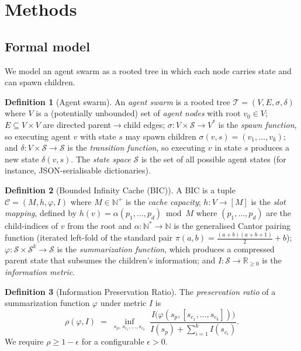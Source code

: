 \documentclass[fleqn,10pt]{article}
\theoremstyle{definition}
\newtheorem{definition}{Definition}
\newcommand{\BIC}{\mathcal{C}}
\newcommand{\States}{\mathcal{S}}
\newcommand{\Tree}{\mathcal{T}}
\newcommand{\info}{I}
\newcommand{\summarize}{\varphi}
\newcommand{\cantor}{\alpha}
\newcommand{\preserv}{\rho}
\newcommand{\Nat}{\mathbb{N}}
\newcommand{\Real}{\mathbb{R}}
\newcommand{\slots}{M}
\begin{document}
\section*{Methods}

\subsection*{Formal model}

We model an agent swarm as a rooted tree in which each node carries
state and can spawn children.

\begin{definition}[Agent swarm]
\label{def:swarm}
An \emph{agent swarm} is a rooted tree $\Tree = (V, E, \sigma, \delta)$
where $V$ is a (potentially unbounded) set of \emph{agent nodes} with
root $v_0 \in V$; $E \subseteq V \times V$ are directed parent$\to$child
edges; $\sigma: V \times \States \to V^*$ is the \emph{spawn function},
so executing agent $v$ with state $s$ may spawn children
$\sigma(v,s) = (v_1, \dots, v_k)$; and
$\delta: V \times \States \to \States$ is the \emph{transition
function}, so executing $v$ in state $s$ produces a new state
$\delta(v,s)$. The \emph{state space} $\States$ is the set of all
possible agent states (for instance, JSON-serialisable dictionaries).
\end{definition}

\begin{definition}[Bounded Infinity Cache (BIC)]
\label{def:bic}
A BIC is a tuple $\BIC = (\slots, h, \summarize, \info)$ where
$\slots \in \Nat^+$ is the \emph{cache capacity};
$h: V \to [\slots]$ is the \emph{slot mapping},
defined by $h(v) = \cantor(p_1, \dots, p_d) \bmod \slots$ where
$(p_1, \dots, p_d)$ are the child-indices of $v$ from the root and
$\cantor: \Nat^* \to \Nat$ is the generalised Cantor pairing function
(iterated left-fold of the standard pair
$\pi(a,b) = \frac{(a+b)(a+b+1)}{2} + b$);
$\summarize: \States \times \States^k \to \States$ is the
\emph{summarization function}, which produces a compressed parent
state that subsumes the children's information; and
$\info: \States \to \Real_{\geq 0}$ is the \emph{information metric}.
\end{definition}

\begin{definition}[Information Preservation Ratio]
\label{def:preservation}
The \emph{preservation ratio} of a summarization function
$\summarize$ under metric $\info$ is
\[
  \preserv(\summarize, \info) \;=\;
    \inf_{s_p,\,s_{c_1},\dots,s_{c_k}} \;
    \frac{\info\bigl(\summarize(s_p, [s_{c_1}, \dots, s_{c_k}])\bigr)}
         {\info(s_p) + \sum_{i=1}^{k} \info(s_{c_i})}.
\]
We require $\preserv \geq 1 - \epsilon$ for a configurable
$\epsilon > 0$.
\end{definition}
\end{document}
